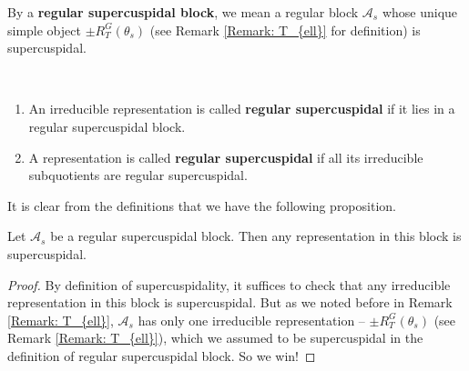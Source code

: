 		\begin{definition}\label{Definition regular supercuspidal block}
			By a \textbf{regular supercuspidal block}, we mean a regular block $\mathcal{A}_s$ whose unique simple object $\pm R_T^G(\theta_s)$ (see Remark \ref{Remark: T_{ell}} for definition) is supercuspidal.
		\end{definition}
		
		\begin{definition}\label{Def regular supercuspidal}\
			
			\begin{enumerate}
				\item An irreducible representation is called \textbf{regular supercuspidal} if it lies in a regular supercuspidal block.
				\item A representation is called \textbf{regular supercuspidal} if all its irreducible subquotients are regular supercuspidal.
			\end{enumerate}
		\end{definition}
		
        It is clear from the definitions that we have the following proposition.
		
		\begin{proposition}\label{Theorem Pure SC}
			Let $\mathcal{A}_s$ be a regular supercuspidal block. Then any representation in this block is supercuspidal.
		\end{proposition}
		
		\begin{proof}
			By definition of supercuspidality, it suffices to check that any irreducible representation in this block is supercuspidal. But as we noted before in Remark \ref{Remark: T_{ell}}, $\mathcal{A}_s$ has only one irreducible representation -- $\pm R_T^G(\theta_s)$ (see Remark \ref{Remark: T_{ell}}), which we assumed to be supercuspidal in the definition of regular supercuspidal block. So we win!
		\end{proof}
		
		
		

